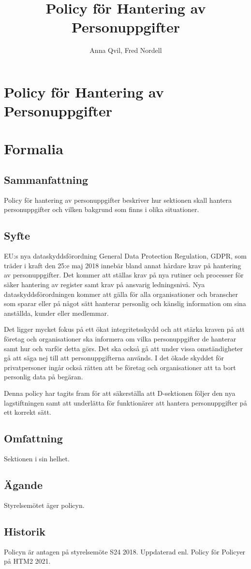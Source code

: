 \documentclass{dsekprotokoll}
\title{Policy för Hantering av Personuppgifter}
\author{Anna Qvil, Fred Nordell}
\begin{document}
\section*{Policy för Hantering av Personuppgifter}
\section{Formalia}
\subsection{Sammanfattning}
Policy för hantering av personuppgifter beskriver hur sektionen skall hantera personuppgifter och vilken bakgrund som finns i olika situationer.
\subsection{Syfte}
EU:s nya dataskyddsförordning General Data Protection Regulation, GDPR, som träder i kraft den 25:e maj 2018 innebär bland annat hårdare krav på hantering av personuppgifter. Det kommer att ställas krav på nya rutiner och processer för säker hantering av register samt krav på ansvarig ledningsnivå. Nya dataskyddsförordningen kommer att gälla för alla organisationer och branscher som sparar eller på något sätt hanterar personlig och känslig information om sina anställda, kunder eller medlemmar.

\par Det ligger mycket fokus på ett ökat integritetsskydd och att stärka kraven på att företag och organisationer ska informera om vilka personuppgifter de hanterar samt hur och varför detta görs. Det ska också gå att under vissa omständigheter gå att säga nej till att personuppgifterna används. I det ökade skyddet för privatpersoner ingår också rätten att be företag och organisationer att ta bort personlig data på begäran.

Denna policy har tagits fram för att säkerställa att D-sektionen följer den nya lagstiftningen samt att underlätta för funktionärer att hantera personuppgifter på ett korrekt sätt.
\subsection{Omfattning}
Sektionen i sin helhet.
\subsection{Ägande}
Styrelsemötet äger policyn.
\subsection{Historik}
Policyn är antagen på styrelsemöte S24 2018.
Uppdaterad enl. Policy för Policyer på HTM2 2021.
\end{document}

